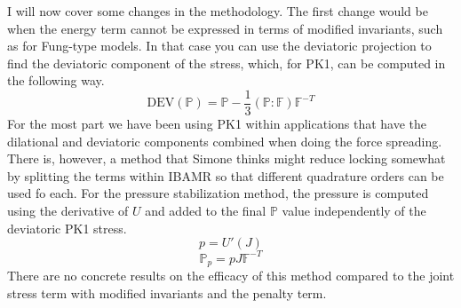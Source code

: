 \documentclass{article}
\def \FF{\mathbb{F}}
\def \PP{\mathbb{P}}
\begin{document}
I will now cover some changes in the methodology. The first change would be when the energy term cannot be expressed in terms of modified invariants, such as for Fung-type models. In that case you can use the deviatoric projection to find the deviatoric component of the stress, which, for PK1, can be computed in the following way.
\[\text{DEV}(\PP) = \PP - \frac{1}{3}(\PP:\FF)\FF^{-T}\]
For the most part we have been using PK1 within applications that have the dilational and deviatoric components combined when doing the force spreading. There is, however, a method that Simone thinks might reduce locking somewhat by splitting the terms within IBAMR so that different quadrature orders can be used fo each. For the pressure stabilization method, the pressure is computed using the derivative of $U$ and added to the final $\PP$ value independently of the deviatoric PK1 stress.
\[p = U'(J)\]
\[\PP_{p} = pJ\FF^{-T}\]
There are no concrete results on the efficacy of this method compared to the joint stress term with modified invariants and the penalty term.
\end{document}
